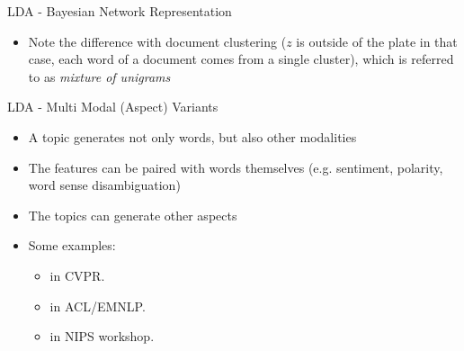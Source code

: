 \documentclass[pdf]{beamer}
\begin{document}
\begin{frame}{LDA - Bayesian Network Representation}
	\hspace{5cm}
	\begin{itemize}
		\item Note the difference with document clustering ($z$ is outside of the plate in that case, each word of a document comes from a single cluster), which is referred to as \textit{mixture of unigrams}
	\end{itemize}
\end{frame}

\begin{frame}{LDA - Multi Modal (Aspect) Variants}
	\begin{itemize}
		\item A topic generates not only words, but also other modalities
		\item The features can be paired with words themselves (e.g. sentiment, polarity, word sense disambiguation)
		\item The topics can generate other aspects
		\item Some examples:
		\begin{itemize}
			\item \cite{putthividhy_topic_2010} in CVPR.
			\item \cite{roller_multimodal_2013} in ACL/EMNLP.
			\item \cite{troelsga_ard_topic_2014} in NIPS workshop. 
		\end{itemize}
	\end{itemize}
\end{frame}
\end{document}

